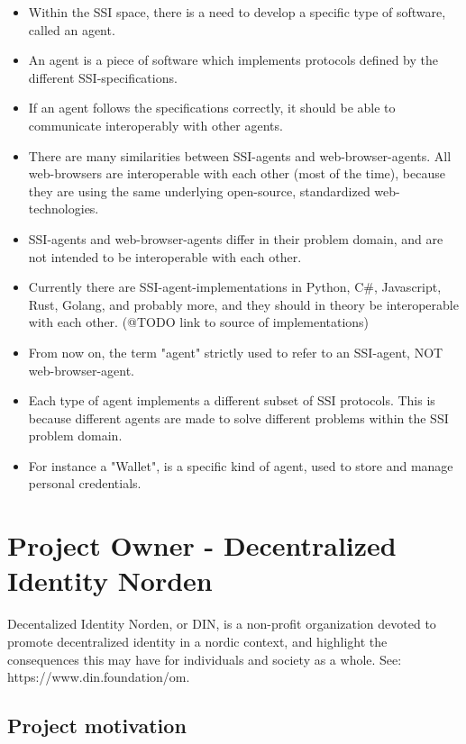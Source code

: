 \begin{itemize}
\item Within the SSI space, there is a need to develop a specific type of software, called an agent.
\item An agent is a piece of software which implements protocols defined by the different SSI-specifications.
\item If an agent follows the specifications correctly, it should be able to communicate interoperably with other agents.
\item There are many similarities between SSI-agents and web-browser-agents. All web-browsers are interoperable with each other (most of the time), because they are using the same underlying open-source, standardized web-technologies.
\item SSI-agents and web-browser-agents differ in their problem domain, and are not intended to be interoperable with each other.
\item Currently there are SSI-agent-implementations in Python, C#, Javascript, Rust, Golang, and probably more, and they should in theory be interoperable with each other. (@TODO link to source of implementations)
\item From now on, the term "agent" strictly used to refer to an SSI-agent, NOT web-browser-agent.
\item Each type of agent implements a different subset of SSI protocols. This is because different agents are made to solve different problems within the SSI problem domain.
\item For instance a "Wallet", is a specific kind of agent, used to store and manage personal credentials.
\end{itemize}



\section{Project Owner - Decentralized Identity Norden}

Decentalized Identity Norden, or DIN, is a non-profit organization devoted to promote decentralized identity in a nordic context, and highlight the consequences this may have for individuals and society as a whole. See: https://www.din.foundation/om. 

\subsection{Project motivation}

